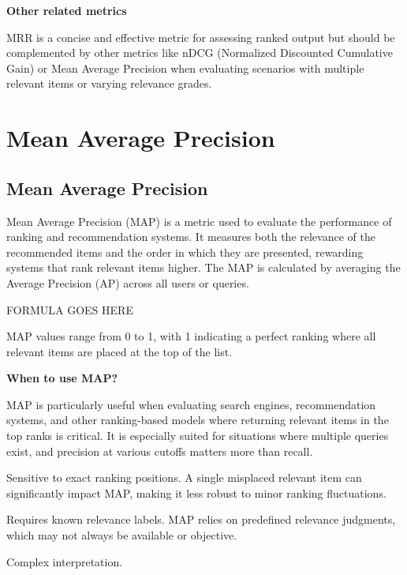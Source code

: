 \textbf{Other related metrics}

MRR is a concise and effective metric for assessing ranked output but should be complemented by other metrics like
nDCG (Normalized Discounted Cumulative Gain) or Mean Average Precision when evaluating scenarios with multiple relevant
items or varying relevance grades.


\clearpage
\thispagestyle{rankingstyle}
\section{Mean Average Precision}
\subsection{Mean Average Precision}

Mean Average Precision (MAP) is a metric used to evaluate the performance of ranking and recommendation systems. It measures
both the relevance of the recommended items and the order in which they are presented, rewarding systems that rank relevant
items higher. The MAP is calculated by averaging the Average Precision (AP) across all users or queries. 

\begin{center}
    FORMULA GOES HERE
\end{center}

MAP values range from 0 to 1, with 1 indicating a perfect ranking where all relevant items are placed at the top of the list.

\textbf{When to use MAP?}

MAP is particularly useful when evaluating search engines, recommendation systems, and other ranking-based models where
returning relevant items in the top ranks is critical. It is especially suited for situations where multiple queries exist,
and precision at various cutoffs matters more than recall.

{
    \item Sensitive to exact ranking positions. A single misplaced relevant item can significantly impact MAP, making it less
    robust to minor ranking fluctuations.
    \item Requires known relevance labels. MAP relies on predefined relevance judgments, which may not always be
    available or objective.
    \item Complex interpretation.

}


